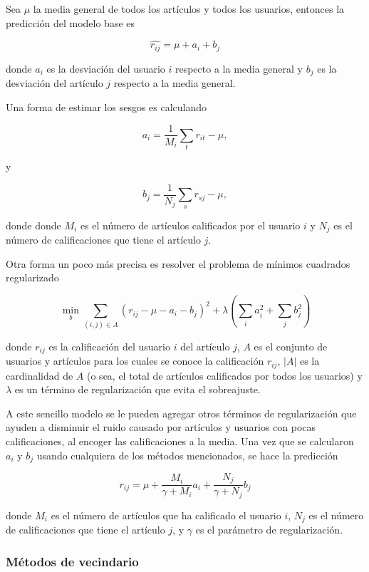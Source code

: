 Sea $\mu$ la media general de todos los artículos y todos los usuarios, entonces la predicción del modelo base es

\[
\hat{r_{ij}} = \mu + a_i + b_j
\]

donde $a_i$ es la desviación del usuario $i$ respecto a la media general y $b_j$ es la desviación del artículo $j$ respecto a la media general.

Una forma de estimar los sesgos es calculando

\[
a_i = \frac{1}{M_i} \sum_t r_{it} - \mu,
\]

y 

\[
b_j = \frac{1}{N_j} \sum_s r_{sj} - \mu,
\]

donde donde $M_i$ es el número de artículos calificados por el usuario $i$ y $N_j$ es el número de calificaciones que tiene el artículo $j$.

Otra forma un poco más precisa es resolver el problema de mínimos cuadrados regularizado

\[
\min_{b} \sum_{(i, j) \in A} \left( r_{ij} - \mu - a_i - b_j \right) ^2 + \lambda \left( \sum_{i} a_i^2 + \sum_{j} b_j^2 \right)
\]

donde $r_{ij}$ es la calificación del usuario $i$ del artículo $j$, $A$ es el conjunto de usuarios y artículos para los cuales se conoce la calificación $r_{ij}$, $ \vert A \vert$ es la cardinalidad de $A$ (o sea, el total de artículos calificados por todos los usuarios) y $\lambda$ es un término de regularización que evita el sobreajuste.

A este sencillo modelo se le pueden agregar otros términos de regularización que ayuden a disminuir el ruido causado por artículos y usuarios con pocas calificaciones, al encoger las calificaciones a la media. Una vez que se calcularon $a_i$ y $b_j$ usando cualquiera de los métodos mencionados, se hace la predicción

\begin{equation}
  \label{ec:modelo_base}
  r_{ij} = \mu + \frac{M_i}{\gamma + M_i} a_i + \frac{N_j}{\gamma + N_j}b_j
\end{equation}

donde $M_i$ es el número de artículos que ha calificado el usuario $i$, $N_j$ es el número de calificaciones que tiene el artículo $j$, y $\gamma$ es el parámetro de regularización.

\subsubsection{Métodos de vecindario}

